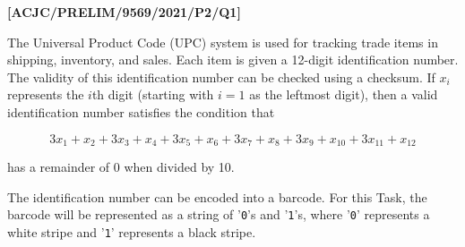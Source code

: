 \item \textbf{{[}ACJC/PRELIM/9569/2021/P2/Q1{]} }

\noindent The Universal Product Code (UPC) system is used for tracking
trade items in shipping, inventory, and sales. Each item is given
a 12-digit identification number. The validity of this identification
number can be checked using a checksum. If $x_{i}$ represents the
$i$th digit (starting with $i=1$ as the leftmost digit), then a
valid identification number satisfies the condition that

\noindent 
\[
3x_{1}+x_{2}+3x_{3}+x_{4}+3x_{5}+x_{6}+3x_{7}+x_{8}+3x_{9}+x_{10}+3x_{11}+x_{12}
\]

\noindent has a remainder of 0 when divided by 10.

\noindent The identification number can be encoded into a barcode.
For this Task, the barcode will be represented as a string of '\texttt{0}'s
and '\texttt{1}'s, where '\texttt{0}' represents a white stripe and
'\texttt{1}' represents a black stripe.

